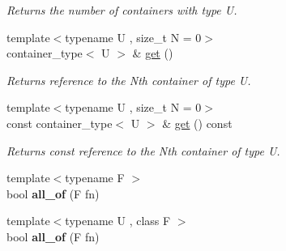 \begin{DoxyCompactItemize}
\begin{DoxyCompactList}\small\item\em Returns the number of containers with type U. \end{DoxyCompactList}\item 
\hypertarget{classheterogeneous_1_1vector_3_01_t_00_01_types_8_8_8_4_a620c9d432b3540832297acb12205f072}{}{\footnotesize template$<$typename U , size\+\_\+t N = 0$>$ }\\container\+\_\+type$<$ U $>$ \& \hyperlink{classheterogeneous_1_1vector_3_01_t_00_01_types_8_8_8_4_a620c9d432b3540832297acb12205f072}{get} ()\label{classheterogeneous_1_1vector_3_01_t_00_01_types_8_8_8_4_a620c9d432b3540832297acb12205f072}

\begin{DoxyCompactList}\small\item\em Returns reference to the Nth container of type U. \end{DoxyCompactList}\item 
\hypertarget{classheterogeneous_1_1vector_3_01_t_00_01_types_8_8_8_4_a18e008fff85d5356bcf91d1811aaf853}{}{\footnotesize template$<$typename U , size\+\_\+t N = 0$>$ }\\const container\+\_\+type$<$ U $>$ \& \hyperlink{classheterogeneous_1_1vector_3_01_t_00_01_types_8_8_8_4_a18e008fff85d5356bcf91d1811aaf853}{get} () const \label{classheterogeneous_1_1vector_3_01_t_00_01_types_8_8_8_4_a18e008fff85d5356bcf91d1811aaf853}

\begin{DoxyCompactList}\small\item\em Returns const reference to the Nth container of type U. \end{DoxyCompactList}\item 
\hypertarget{classheterogeneous_1_1vector_3_01_t_00_01_types_8_8_8_4_a2f921419670aaef4ecd305e79324faad}{}{\footnotesize template$<$typename F $>$ }\\bool {\bfseries all\+\_\+of} (F fn)\label{classheterogeneous_1_1vector_3_01_t_00_01_types_8_8_8_4_a2f921419670aaef4ecd305e79324faad}

\item 
\hypertarget{classheterogeneous_1_1vector_3_01_t_00_01_types_8_8_8_4_ab9807c0f2138f24bd3d269c275011a7b}{}{\footnotesize template$<$typename U , class F $>$ }\\bool {\bfseries all\+\_\+of} (F fn)\label{classheterogeneous_1_1vector_3_01_t_00_01_types_8_8_8_4_ab9807c0f2138f24bd3d269c275011a7b}


\end{DoxyCompactItemize}
